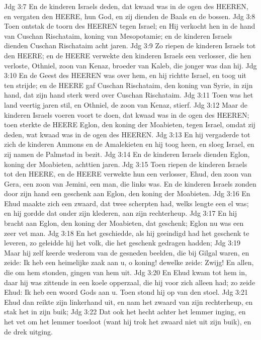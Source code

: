 Jdg 3:7  En de kinderen Israels deden, dat kwaad was in de ogen des HEEREN, en vergaten den HEERE, hun God, en zij dienden de Baals en de bossen.
Jdg 3:8  Toen ontstak de toorn des HEEREN tegen Israel; en Hij verkocht hen in de hand van Cuschan Rischataim, koning van Mesopotamie; en de kinderen Israels dienden Cuschan Rischataim acht jaren.
Jdg 3:9  Zo riepen de kinderen Israels tot den HEERE; en de HEERE verwekte den kinderen Israels een verlosser, die hen verloste, Othniel, zoon van Kenaz, broeder van Kaleb, die jonger was dan hij.
Jdg 3:10  En de Geest des HEEREN was over hem, en hij richtte Israel, en toog uit ten strijde; en de HEERE gaf Cuschan Rischataim, den koning van Syrie, in zijn hand, dat zijn hand sterk werd over Cuschan Rischataim.
Jdg 3:11  Toen was het land veertig jaren stil, en Othniel, de zoon van Kenaz, stierf.
Jdg 3:12  Maar de kinderen Israels voeren voort te doen, dat kwaad was in de ogen des HEEREN; toen sterkte de HEERE Eglon, den koning der Moabieten, tegen Israel, omdat zij deden, wat kwaad was in de ogen des HEEREN.
Jdg 3:13  En hij vergaderde tot zich de kinderen Ammons en de Amalekieten en hij toog heen, en sloeg Israel, en zij namen de Palmstad in bezit.
Jdg 3:14  En de kinderen Israels dienden Eglon, koning der Moabieten, achttien jaren.
Jdg 3:15  Toen riepen de kinderen Israels tot den HEERE, en de HEERE verwekte hun een verlosser, Ehud, den zoon van Gera, een zoon van Jemini, een man, die links was. En de kinderen Israels zonden door zijn hand een geschenk aan Eglon, den koning der Moabieten.
Jdg 3:16  En Ehud maakte zich een zwaard, dat twee scherpten had, welks lengte een el was; en hij gordde dat onder zijn klederen, aan zijn rechterheup.
Jdg 3:17  En hij bracht aan Eglon, den koning der Moabieten, dat geschenk; Eglon nu was een zeer vet man.
Jdg 3:18  En het geschiedde, als hij geeindigd had het geschenk te leveren, zo geleidde hij het volk, die het geschenk gedragen hadden;
Jdg 3:19  Maar hij zelf keerde wederom van de gesneden beelden, die bij Gilgal waren, en zeide: Ik heb een heimelijke zaak aan u, o koning! dewelke zeide: Zwijg! En allen, die om hem stonden, gingen van hem uit.
Jdg 3:20  En Ehud kwam tot hem in, daar hij was zittende in een koele opperzaal, die hij voor zich alleen had; zo zeide Ehud: Ik heb een woord Gods aan u. Toen stond hij op van den stoel.
Jdg 3:21  Ehud dan reikte zijn linkerhand uit, en nam het zwaard van zijn rechterheup, en stak het in zijn buik;
Jdg 3:22  Dat ook het hecht achter het lemmer inging, en het vet om het lemmer toesloot (want hij trok het zwaard niet uit zijn buik), en de drek uitging.
